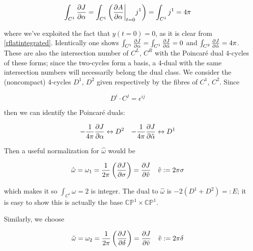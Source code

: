 \begin{equation}
	\int_{C^1} \frac{\partial J}{\partial\alpha} = \int_{C^1}\left( \frac{\partial A}{\partial\alpha}\bigg|_{t=0} j^1 \right) = \int_{C^1} j^1 = 4\pi
	\label{}
\end{equation}

where we've exploited the fact that $y(t=0) = 0$, as it is clear from \ref{rflatintegrated}. Identically one shows $\int_{C^1} \frac{\partial J}{\partial\alpha} = \int_{C^1} \frac{\partial J}{\partial\tilde\alpha} = 0$ and $\int_{C^2} \frac{\partial J}{\partial\tilde\alpha} = 4\pi$. These are also the intersection number of $C^L$, $C^R$ with the Poincar\'e dual 4-cycles of these forms; since the two-cycles form a basis, a 4-dual with the same intersection numbers will necessarily belong the dual class. We consider the (noncompact) 4-cycles $D^1$, $D^2$ given respectively by the fibres of $C^1$, $C^2$. Since

\begin{equation}
	D^i \cdot C^j = \epsilon^{ij}	
\end{equation}

then we can identify the Poincar\'e duals:

\begin{align}
	- \frac{1}{4\pi} \frac{\partial J}{\partial\alpha} \leftrightarrow D^2 && - \frac{1}{4\pi}\frac{\partial J}{\partial\tilde\alpha} \leftrightarrow D^1
	\label{}
\end{align}

Then a useful normalization for $\hat\omega$ would be

\begin{align}
	\hat\omega = \omega_1 = \frac{1}{2\pi}\left( \frac{\partial J}{\partial\sigma} \right) = \frac{\partial J}{\partial\hat v} && \hat v := 2\pi \sigma
	\label{}
\end{align}

which makes it so $\int_{C^i} \omega = 2$ is integer. The dual to $\hat \omega $ is $-2(D^1+D^2) =: E$; it is easy to show this is actually the base $\mathbb{CP}^1 \times \mathbb{CP}^1$.
%
%
%

Similarly, we choose

\begin{align}
	\tilde \omega = \omega_2 = \frac{1}{2\pi} \left( \frac{\partial J}{\partial\delta} \right) = \frac{\partial J}{\partial\tilde v} && \tilde v := 2\pi\delta
	\label{}
\end{align}


